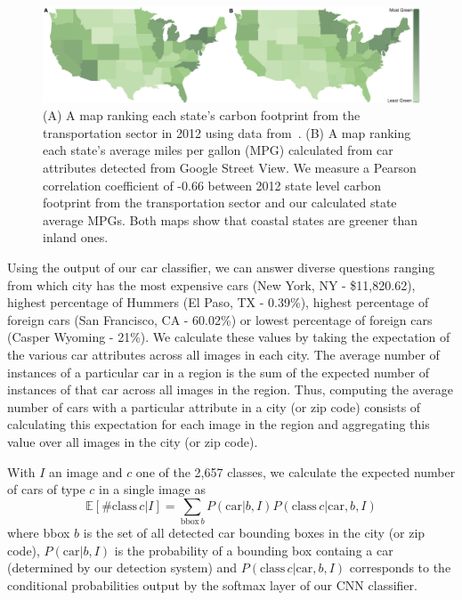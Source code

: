 \documentclass[letterpaper]{article}
\begin{document}
\begin{figure} [t]
\begin{center}
\includegraphics[width=1.0\linewidth]{img/green.jpg}
\end{center}
\caption {(A) A map ranking each state's carbon footprint from the transportation sector in 2012 using data from~\cite{state_ranking}. (B) A map ranking each state's average miles per gallon (MPG) calculated from car attributes detected from Google Street View. We measure a Pearson correlation coefficient of -0.66 between 2012 state level carbon footprint from the transportation sector and our calculated state average MPGs. Both maps show that coastal states are greener than inland ones.}
\label{fig:mpg}
\end{figure}
Using the output of our car classifier, we can answer diverse questions ranging from which city has the most expensive cars (New York, NY - \$11,820.62), highest percentage of Hummers (El Paso, TX - 0.39\%), highest percentage of foreign cars (San Francisco, CA - 60.02\%) or lowest percentage of foreign cars (Casper Wyoming - 21\%). We calculate these values by taking the expectation of the various car attributes across all images in each city. The average number of instances of a particular car in a region is the sum of the expected number of instances of that car across all images in the region. Thus, computing the average number of cars with a particular attribute in a city (or zip code) consists of calculating this expectation for each image in the region and aggregating this value over all images in the city (or zip code).

With $I$ an image and $c$ one of the 2,657 classes, we calculate the expected number of cars of type $c$ in a single image as
\begin{equation}
\mathbb{E}[\mathrm{\#class}\, c | I] = \sum_{\mathrm{bbox}\,b} P(\mathrm{car}|b,I) P(\mathrm{class}\, c | \mathrm{car},b,I)
\end{equation}
where bbox $b$ is the set of all detected car bounding boxes in the city (or zip code), $P(\mathrm{car}|b,I)$ is the probability of a bounding box containg a car (determined by our detection system) and $P(\mathrm{class}\, c | \mathrm{car},b,I)$ corresponds to the conditional probabilities output by the softmax layer of our CNN classifier. 
\end{document}
